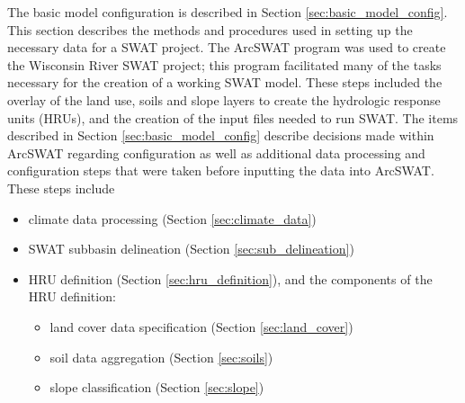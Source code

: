 The basic model configuration is described in Section \ref{sec:basic_model_config}. 
This section describes the methods and procedures used in setting up the necessary data for a SWAT project. 
The ArcSWAT program was used to create the Wisconsin River SWAT project;
this program facilitated many of the tasks necessary for the creation of a working SWAT model.
These steps included the overlay of the land use, soils and slope layers to create the hydrologic response units (HRUs), and the creation of the input files needed to run SWAT. 
The items described in Section \ref{sec:basic_model_config} describe decisions made within ArcSWAT regarding configuration as well as additional data processing and configuration steps that were taken before inputting the data into ArcSWAT. 
These steps include 
\begin{itemize}
\item climate data processing (Section \ref{sec:climate_data})
\item SWAT subbasin delineation (Section \ref{sec:sub_delineation})
\item HRU definition (Section \ref{sec:hru_definition}), and the components of the HRU definition:
	\begin{itemize}
		\item land cover data specification (Section \ref{sec:land_cover})
		\item soil data aggregation (Section \ref{sec:soils})
		\item slope classification (Section \ref{sec:slope})
	\end{itemize}
\end{itemize}

